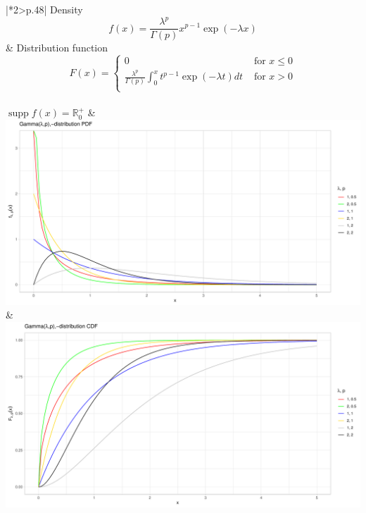 \documentclass{article}
\DeclareMathOperator\supp{supp}
\begin{document}
	\begin{tabular}{|*2{>{\centering\arraybackslash}p{}|}}
		\hline
		Density
		\[ f \left ( x \right ) = \frac{\lambda^{p}}{\Gamma\left ( p \right )} x^{p-1} \exp\left ( - \lambda x \right ) 
		\] 
		& Distribution function
		\[ F \left ( x \right ) = \left\{\begin{matrix}
			0 & \text{ for } x\leq 0\\ 
			\frac{\lambda^{p}}{\Gamma\left ( p \right )}\int_{0}^{x} t^{p-1} \exp\left ( - \lambda t \right ) dt  & \text{ for } x>0\\ 
		\end{matrix} \right. \]
		\\
		$\supp f\left( x\right) = \mathbb{R}^{+}_{0}$ &
		\\
		\includegraphics[width=1.0\linewidth]{material/gamma_PDF}
		\label{fig:gamma_PDF}
		&
		\includegraphics[width=1.0\linewidth]{material/gamma_CDF}
		\label{fig:gamma_CDF}
		\\
	\end{tabular} \\
	
\end{document}
